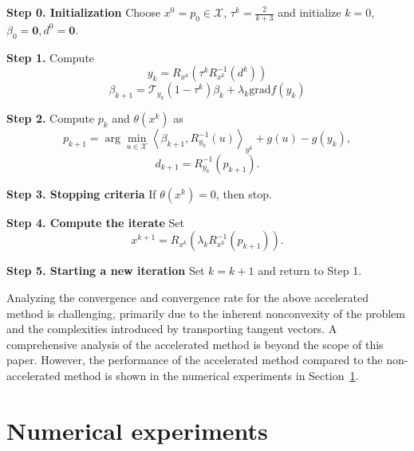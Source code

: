 \documentclass[pdflatex,sn-mathphys-num]{sn-jnl}%
\theoremstyle{definition} %
\theoremstyle{remark} %
\newcommand{\grad}{\mathrm{grad}}
\begin{document}
\begin{algorithm}[H]
    \caption{Riemannian accelerated GCG method }\label{alg:RMGCG3}
    \textbf{Step 0. Initialization}
     Choose $x^0 = p_0\in \mathcal{X}$, $\tau^k = \frac{2}{k+3}$ and initialize $k = 0$, $\beta_0=\mathbf{0}, d^0 =\mathbf{0}$.

     \textbf{Step 1. }
     Compute
     $$y_k = R_{x^k}(\tau^k R^{-1}_{x^k}(d^k)) $$
     $$\beta_{k+1} = \mathcal{T}_{y_k}(1-\tau^k)\beta_k + \lambda_k\grad f(y_k)$$
     
     \textbf{Step 2. }
     Compute $p_k$ and $\theta(x^k)$ as
     \[ p_{k+1} = \arg\min_{u \in \mathcal{X}}  \left\langle\beta_{k+1}, R_{y_k}^{-1}(u)\right\rangle_{y^k}  +g(u) -g(y_k), \] 
    $$d_{k+1}= R_{y_k}^{-1}(p_{k+1}).$$
    
     \textbf{Step 3. Stopping criteria}
     If $\theta(x^k) = 0$, then stop.
    
     \textbf{Step 4. Compute the iterate}
     Set
     \[ x^{k+1} = R_{x^k} ( \lambda_k R^{-1}_{x^k}(p_{k+1})). \] 
    
     \textbf{Step 5. Starting a new iteration}
     Set $k = k + 1$ and return to Step 1.
\end{algorithm}


Analyzing the convergence and convergence rate for the above accelerated method is challenging, primarily due to the inherent nonconvexity of the problem and
the complexities introduced by transporting tangent vectors.
A comprehensive analysis of the accelerated method is beyond the scope of this paper.
However, the performance of the accelerated method compared to the non-accelerated method is shown in the numerical experiments in Section~\ref{sec: expreriment}.





\section{Numerical experiments}
\label{sec: expreriment}
\end{document}
